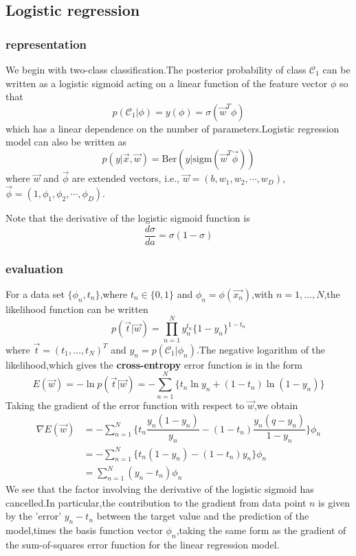 \subsection{Logistic regression}
\subsubsection{representation}
We begin with two-class classification.The posterior probability of class $\mathcal{C}_1$ can be written as a logistic sigmoid acting on a linear function of the feature vector $\phi$ so that 
\begin{equation}
p(\mathcal{C}_1|\phi) = y(\phi) = \sigma(\vec{w}^T\phi)
\end{equation}
which has a linear dependence on the number of parameters.Logistic regression model can also be written as
\begin{equation}
p(y|\vec{x},\vec{w})=\mathrm{Ber}(y|\mathrm{sigm}(\vec{w}^T\vec{\phi}))
\end{equation}
where $\vec{w}$ and $\vec{\phi}$ are extended vectors, i.e., $\vec{w}=(b, w_1, w_2,\cdots, w_D)$, $\vec{\phi}=(1, \phi_1, \phi_2,\cdots, \phi_D)$.

Note that the derivative of the logistic sigmoid function is
\begin{equation}
\dfrac{d\sigma}{da} = \sigma(1-\sigma)
\end{equation}

\subsubsection{evaluation}
For a data set $\{\phi_n,t_n \}$,where $t_n \in \{0,1\}$ and $\phi_n = \phi(\vec{x_n})$,with $n = 1,...,N$,the likelihood function can be written
\begin{equation}
p(\vec{t}|\vec{w}) = \prod_{n=1}^{N}y_n^{t_n}\{1-y_n \}^{1-t_n}
\end{equation}
where $\vec{t}=(t_1,...,t_N)^T$ and $y_n = p(\mathcal{C}_1|\phi_n)$.The negative logarithm of the likelihood,which gives the \textbf{cross-entropy} error function is in the form
\begin{equation}
E(\vec{w})=-\ln p(\vec{t}|\vec{w})=-\sum_{n=1}^{N}\{t_n\ln y_n +(1-t_n)\ln (1-y_n) \}
\end{equation}
Taking the gradient of the error function with respect to $\vec{w}$,we obtain
\begin{align}
\nabla E(\vec{w}) 
&=-\sum\limits_{n=1}^{N}\{t_n\dfrac{y_n(1-y_n)}{y_n}-
(1-t_n)\dfrac{y_n(q-y_n)}{1-y_n} \}\phi_n\\
&=-\sum_{n=1}^{N}\{t_n(1-y_n)-(1-t_n)y_n \}\phi_n\\
&=\sum_{n=1}^{N}(y_n-t_n)\phi_n
\end{align}
We see that the factor involving the derivative of the logistic sigmoid has cancelled.In particular,the contribution to the gradient from data point $n$ is given by the 'error' $y_n-t_n$ between the target value and the prediction of the model,times the basis function vector $\phi_n$,taking the same form as the gradient of the sum-of-squares error function for the linear regression model.

